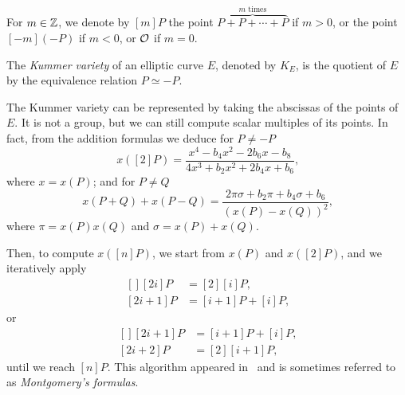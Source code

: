 For $m\in\mathbb{Z}$, we denote by $[m]P$ the point
 $\overbrace{P+P+\cdots+P}^{m\text{ times}}$ if $m>0$, or the
point $[-m](-P)$ if $m<0$, or $\mathcal{O}$ if $m=0$. 

\begin{definition}
  \label{def:kummer}
  The \emph{Kummer variety} of an elliptic curve
  $E$, denoted by $K_E$, is the quotient of $E$ by the equivalence
  relation $P\simeq-P$.
\end{definition}

\begin{remark}
  \label{rk:montgomery}
  The Kummer variety can be represented by taking the abscissas of the
  points of $E$. It is not a group, but we can still compute scalar
  multiples of its points. In fact, from the addition formulas we
  deduce for $P\ne-P$
  \begin{equation}
    \label{eq:128}
    x([2]P) = \frac{x^4-b_4x^2-2b_6x-b_8}{4x^3+b_2x^2+2b_4x+b_6}
    \text{,}
  \end{equation}
  where $x=x(P)$; and for $P\ne Q$
  \begin{equation}
    \label{eq:129}
    x(P+Q) + x(P-Q) =
    \frac{2\pi\sigma + b_2\pi + b_4\sigma + b_6}{(x(P)-x(Q))^2}
    \text{,}
  \end{equation}
  where $\pi=x(P)x(Q)$ and $\sigma=x(P)+x(Q)$. 

  Then, to compute $x([n]P)$, we start from $x(P)$ and $x([2]P)$, and
  we iteratively apply
  \begin{equation}
    \label{eq:130}
    \begin{aligned}[]
      [2i]P   &= [2][i]P\text{,}\\
      [2i+1]P &= [i+1]P + [i]P\text{,}
    \end{aligned}
  \end{equation}  
  or
  \begin{equation}
    \label{eq:131}
    \begin{aligned}[]
      [2i+1]P &= [i+1]P + [i]P\text{,}\\
      [2i+2]P &= [2][i+1]P\text{,}
    \end{aligned}
  \end{equation}
  until we reach $[n]P$. This algorithm appeared
  in~\cite{montgomery87} and is sometimes referred to as
  \emph{Montgomery's formulas}.
\end{remark}

